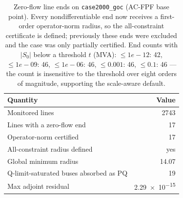 \begin{table}[t]
\centering
\caption{Zero-flow line ends on \texttt{case2000\_goc} (AC-FPF base point).
Every nondifferentiable end now receives a first-order operator-norm radius,
so the all-constraint certificate is defined; previously these ends were
excluded and the case was only partially certified.  End counts with
$|S_0|$ below a threshold $t$ (MVA): $\le 1e-12$: 42, $\le 1e-09$: 46, $\le 1e-06$: 46, $\le 0.001$: 46, $\le 0.1$: 46 --- the count is insensitive to the
threshold over eight orders of magnitude, supporting the scale-aware default.
\label{tab:zero-flow}}
\footnotesize
\begin{tabularx}{\textwidth}{@{}Xr@{}}
\toprule
Quantity & Value \\
\midrule
Monitored lines & 2743 \\
Lines with a zero-flow end & 17 \\
Operator-norm certified & 17 \\
All-constraint radius defined & yes \\
Global minimum radius & 14.07 \\
Q-limit-saturated buses absorbed as PQ & 19 \\
Max adjoint residual & \num{2.29e-15} \\
\bottomrule
\end{tabularx}
\end{table}
